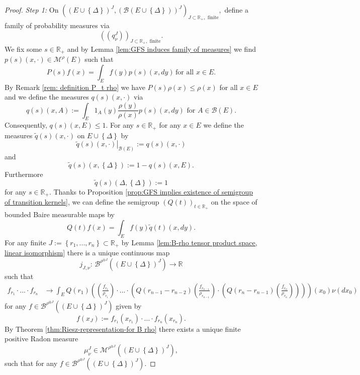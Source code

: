 \documentclass[a4paper,12pt]{article}
\theoremstyle{definition}
\theoremstyle{remark}
\numberwithin{equation}{section}
\numberwithin{theorem}{section}
\begin{document}
\begin{proof}
\emph{Step 1:} On
$
\left(\left(E\cup\left\{ \Delta\right\} \right)^{J},\left(\mathcal{B}\left(E\cup\left\{ \Delta\right\} \right)\right)^{J}\right)_{J\subset\mathbb{R}_{+},\text{ finite}},
$ define a family of probability
measures via
$$
\left(\left(q_{\nu}^{J}\right)\right)_{J\subset\mathbb{R}_{+},\text{ finite}}.
$$
We fix some $s\in\mathbb{R}_{+}$ and by Lemma \ref{lem:GFS induces family of measures}
we find $p(s)(x,\cdot)\in\mathcal{M}^{\rho}(E)$ such that
\[
P(s)f(x)=\int_{E}f(y)p(s)(x,dy)\,\text{for all }x\in E.
\]
By Remark \ref{rem: definition P_t rho}
we have $P(s)\rho(x) \leq\rho(x)$ 
for all $x\in E$
and we define  the measures $q(s)(x,\cdot)$ via
\[
q(s)(x,A):=\int_{E}1_{A}(y)\frac{\rho(y)}{\rho(x)}p(s)(x,dy)\text{ for }A\in\mathcal{B}(E).
\]
Consequently, $q(s)(x,E)\leq1$. For any $s\in\mathbb{R}_{+}$ for
any $x\in E$ we define the measures $\tilde{q}(s)(x,\cdot)$ on $E\cup\left\{ \Delta\right\} $
by
\[
\left.\tilde{q}(s)(x,\cdot)\right|_{\mathcal{B}(E)}:=q(s)(x,\cdot)
\]
and 
\[
\tilde{q}(s)(x,\left\{ \Delta\right\} ):=1-q(s)(x,E).
\]
 Furthermore
\[
\tilde{q}(s)(\Delta,\left\{ \Delta\right\} ):=1
\]
for any $s\in\mathbb{R}_{+}$. Thanks to Proposition \ref{prop:GFS implies existence of semigroup of transition kernels},
we can define the semigroup $\left(Q(t)\right)_{t\in\mathbb{R}_{+}}$
on the space 
 of bounded Baire measurable maps 
by 
\[
Q(t)f(x)=\int_{E}f(y)\tilde{q}(t)(x,dy).
\]
For any finite $J:=\left\{ r_{1},...,r_{n}\right\} \subset\mathbb{R}_{+}$
by Lemma \ref{lem:B-rho tensor product space, linear isomorphism}\textcolor{red}{{}
}there is a unique continuous map
\[
j_{J,\nu}:\,\mathcal{\mathscr{B}}^{\rho^{\otimes J}}(\left(E\cup\left\{ \Delta\right\} \right)^{J})\rightarrow\mathbb{R}
\]
such that {\footnotesize
\begin{align*}
f_{r_{1}}\cdot...\cdot f_{r_{n}} & \rightarrow\int_{E}Q(r_{1})\left(\left(\frac{f_{r_{1}}}{\rho_{r_{1}}}\right)\cdot...\cdot\left(Q(r_{n-1}-r_{n-2})\left(\frac{f_{r_{n-1}}}{\rho_{r_{n-1}}}\right)\cdot\left(Q(r_{n}-r_{n-1})\left(\frac{f_{r_{n}}}{\rho_{r_{n}}}\right)\right)\right)\right)(x_{0})\nu(dx_{0})
\end{align*}
}
for any $f\in\mathcal{\mathscr{B}}^{\rho^{\otimes J}}\left(\left(E\cup\left\{ \Delta\right\} \right)^{J}\right)$
given by 
\[
f(x_{J}):=f_{r_1}(x_{r_1})\cdot \ldots \cdot f_{r_n}(x_{r_n}).
\]
By Theorem \ref{thm:Riesz-representation-for B rho} there exists
a unique finite positive Radon measure
\[
\mu_{\nu}^{J}\in\mathcal{M}^{\rho^{\otimes J}}\left(\left(E\cup\left\{ \Delta\right\} \right)^{J}\right),
\]
such that for any $f\in\mathcal{\mathscr{B}}^{\rho^{\otimes J}}\left(\left(E\cup\left\{ \Delta\right\} \right)^{J}\right).$

\end{proof}
\end{document}
